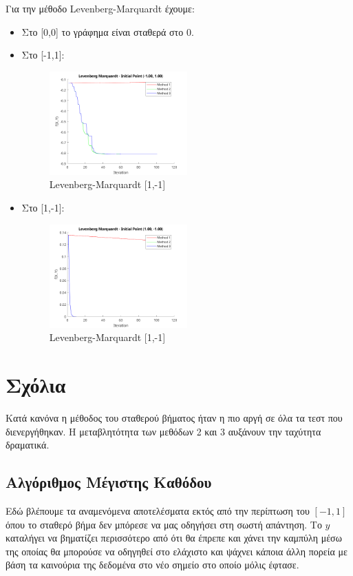 \documentclass{report}
\begin{document}
Για την μέθοδο Levenberg-Marquardt έχουμε:
\begin{itemize}
    \item Στο [0,0] το γράφημα είναι σταθερά στο 0.
    \item Στο [-1,1]:
    \begin{figure}[H]
        \centering
        \includegraphics[width=0.5\textwidth]{media/leven-11.png}
        \caption{Levenberg-Marquardt [1,-1]}
    \end{figure}
    \item Στο [1,-1]:
    \begin{figure}[H]
        \centering
        \includegraphics[width=0.5\textwidth]{media/leven1-1.png}
        \caption{Levenberg-Marquardt [1,-1]}
    \end{figure}
\end{itemize}

\section{Σχόλια}
Κατά κανόνα η μέθοδος του σταθερού βήματος ήταν η πιο αργή σε όλα τα τεστ που διενεργήθηκαν.
Η μεταβλητότητα των μεθόδων 2 και 3 αυξάνουν την ταχύτητα δραματικά. 

\subsection{Αλγόριθμος Μέγιστης Καθόδου}
Εδώ βλέπουμε τα αναμενόμενα αποτελέσματα εκτός από την περίπτωση του \([-1,1]\) όπου το σταθερό
βήμα δεν μπόρεσε να μας οδηγήσει στη σωστή απάντηση. Το $y$ καταλήγει να βηματίζει περισσότερο 
από ότι θα έπρεπε και χάνει την καμπύλη μέσω της οποίας θα μπορούσε να οδηγηθεί στο ελάχιστο και 
ψάχνει κάποια άλλη πορεία με βάση τα καινούρια της δεδομένα στο νέο σημείο στο οποίο μόλις έφτασε.
\end{document}
